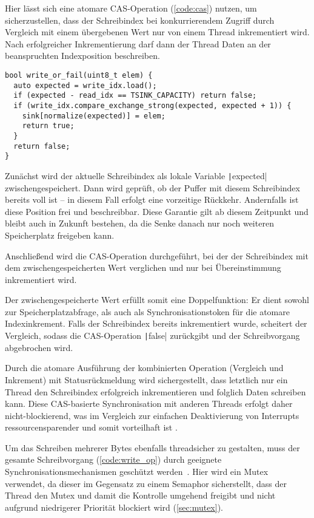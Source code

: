 Hier lässt sich eine atomare \ac{CAS}-Operation (\ref{code:cas}) nutzen, um
sicherzustellen, dass der Schreibindex bei konkurrierendem Zugriff durch
Vergleich mit einem übergebenen Wert nur von einem Thread inkrementiert wird.
Nach erfolgreicher Inkrementierung darf dann der Thread Daten an der
beanspruchten Indexposition beschreiben.

\begin{code}
\begin{verbatim}
bool write_or_fail(uint8_t elem) {
  auto expected = write_idx.load();
  if (expected - read_idx == TSINK_CAPACITY) return false;
  if (write_idx.compare_exchange_strong(expected, expected + 1)) {
    sink[normalize(expected)] = elem;
    return true;
  }
  return false;
}
\end{verbatim}
    \label{code:cas}
\end{code}

Zunächst wird der aktuelle Schreibindex als lokale Variable
\texttt|expected| zwischengespeichert. Dann wird geprüft, ob der Puffer
mit diesem Schreibindex bereits voll ist -- in diesem Fall erfolgt eine
vorzeitige Rückkehr. Andernfalls ist diese Position frei und beschreibbar. Diese
Garantie gilt ab diesem Zeitpunkt und bleibt auch in Zukunft bestehen, da die
Senke danach nur noch weiteren Speicherplatz freigeben kann.

Anschließend wird die CAS-Operation durchgeführt, bei der der Schreibindex mit
dem zwischengespeicherten Wert verglichen und nur bei Übereinstimmung
inkrementiert wird.

Der zwischengespeicherte Wert erfüllt somit eine Doppelfunktion: Er dient sowohl
zur Speicherplatzabfrage, als auch als Synchronisationstoken für die atomare
Indexinkrement. Falls der Schreibindex bereits inkrementiert wurde, scheitert
der Vergleich, sodass die CAS-Operation \texttt|false| zurückgibt und
der Schreibvorgang abgebrochen wird.

Durch die atomare Ausführung der kombinierten Operation (Vergleich und
Inkrement) mit Statusrückmeldung wird sichergestellt, dass letztlich nur ein
Thread den Schreibindex erfolgreich inkrementieren und folglich Daten schreiben
kann. Diese CAS-basierte Synchronisation mit anderen Threads erfolgt daher
nicht-blockierend, was im Vergleich zur einfachen Deaktivierung von Interrupts
ressourcensparender und somit vorteilhaft ist \cite{wikipedia_cas}.

Um das Schreiben mehrerer Bytes ebenfalls threadsicher zu gestalten, muss der
gesamte Schreibvorgang (\ref{code:write_op}) durch geeignete
Synchronisationsmechanismen geschützt werden~\cite{FreeRTOSForumPrintf}. Hier
wird ein Mutex verwendet, da dieser im Gegensatz zu einem Semaphor sicherstellt,
dass der Thread den Mutex und damit die Kontrolle umgehend freigibt und nicht
aufgrund niedrigerer Priorität blockiert wird (\ref{sec:mutex}).


